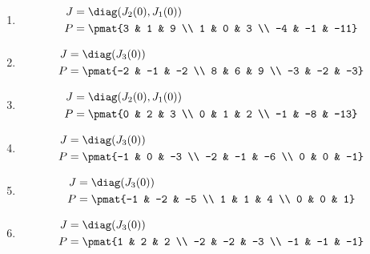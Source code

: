 \begin{enumerate}
\item

\begin{align*}
J &= \diag(J_{2}(0), J_{1}(0))\\
P &= \pmat{3 & 1 & 9 \\ 1 & 0 & 3 \\ -4 & -1 & -11}
\end{align*}

\item

\begin{align*}
J &= \diag(J_{3}(0))\\
P &= \pmat{-2 & -1 & -2 \\ 8 & 6 & 9 \\ -3 & -2 & -3}
\end{align*}

\item

\begin{align*}
J &= \diag(J_{2}(0), J_{1}(0))\\
P &= \pmat{0 & 2 & 3 \\ 0 & 1 & 2 \\ -1 & -8 & -13}
\end{align*}

\item

\begin{align*}
J &= \diag(J_{3}(0))\\
P &= \pmat{-1 & 0 & -3 \\ -2 & -1 & -6 \\ 0 & 0 & -1}
\end{align*}

\item

\begin{align*}
J &= \diag(J_{3}(0))\\
P &= \pmat{-1 & -2 & -5 \\ 1 & 1 & 4 \\ 0 & 0 & 1}
\end{align*}

\item

\begin{align*}
J &= \diag(J_{3}(0))\\
P &= \pmat{1 & 2 & 2 \\ -2 & -2 & -3 \\ -1 & -1 & -1}
\end{align*}


\end{enumerate}

